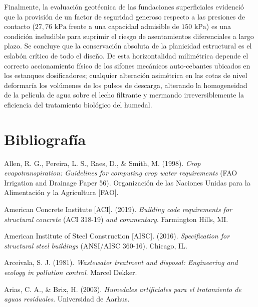 \documentclass[12pt, letterpaper]{report}
\begin{document}
Finalmente, la evaluación geotécnica de las fundaciones superficiales evidenció que la provisión de un factor de seguridad generoso respecto a las presiones de contacto ($27,76\text{ kPa}$ frente a una capacidad admisible de $150\text{ kPa}$) es una condición ineludible para suprimir el riesgo de asentamientos diferenciales a largo plazo. Se concluye que la conservación absoluta de la planicidad estructural es el eslabón crítico de todo el diseño. De esta horizontalidad milimétrica depende el correcto accionamiento físico de los sifones mecánicos auto-cebantes ubicados en los estanques dosificadores; cualquier alteración asimétrica en las cotas de nivel deformaría los volúmenes de los pulsos de descarga, alterando la homogeneidad de la película de agua sobre el lecho filtrante y mermando irreversiblemente la eficiencia del tratamiento biológico del humedal.

\newpage

\chapter{Bibliografía}

\setlength{\parindent}{0pt}

Allen, R. G., Pereira, L. S., Raes, D., \& Smith, M. (1998). \textit{Crop evapotranspiration: Guidelines for computing crop water requirements} (FAO Irrigation and Drainage Paper 56). Organización de las Naciones Unidas para la Alimentación y la Agricultura [FAO].

American Concrete Institute [ACI]. (2019). \textit{Building code requirements for structural concrete} (ACI 318-19) \textit{and commentary}. Farmington Hills, MI.

American Institute of Steel Construction [AISC]. (2016). \textit{Specification for structural steel buildings} (ANSI/AISC 360-16). Chicago, IL.

Arceivala, S. J. (1981). \textit{Wastewater treatment and disposal: Engineering and ecology in pollution control}. Marcel Dekker.

Arias, C. A., \& Brix, H. (2003). \textit{Humedales artificiales para el tratamiento de aguas residuales}. Universidad de Aarhus.
\end{document}
